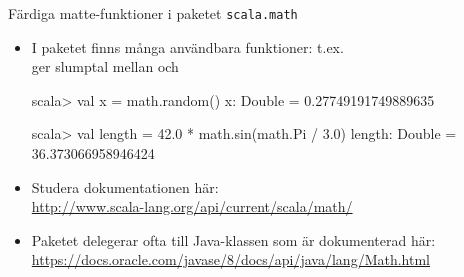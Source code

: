 \begin{Slide}{Färdiga matte-funktioner i paketet \texttt{scala.math}}\SlideFontSmall
\begin{itemize}
\item I paketet \texttt{} finns många användbara funktioner: t.ex.\\
 ger slumptal mellan  och 
\begin{REPLnonum}
scala> val x = math.random()
x: Double = 0.27749191749889635

scala> val length = 42.0 * math.sin(math.Pi / 3.0)
length: Double = 36.373066958946424
\end{REPLnonum}

\item Studera dokumentationen här: \\{\SlideFontTiny
\url{http://www.scala-lang.org/api/current/scala/math/}}

\item Paketet  delegerar ofta till Java-klassen \texttt{} som är dokumenterad här: \\{\SlideFontTiny
\url{https://docs.oracle.com/javase/8/docs/api/java/lang/Math.html}}

\end{itemize}
\end{Slide}




